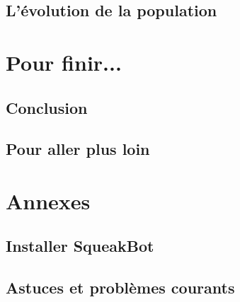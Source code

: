 \documentclass[a4paper,12pt]{book}
\def\appName{SqueakBot}
\begin{document}
\section{L'évolution de la population}

\chapter{Pour finir...}

\section{Conclusion}

\section{Pour aller plus loin}
\chapter{Annexes}

\section{Installer \appName}

\section{Astuces et problèmes courants}
\end{document}
